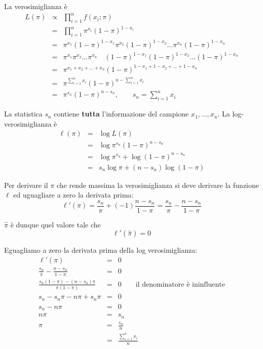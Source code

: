 \documentclass[
  11pt,
]{book}
\theoremstyle{mytheoremstyle}
\theoremstyle{mydefstyle}
\begin{document}
La verosimiglianza è
\begin{eqnarray*}
L(\pi)     &\propto& \prod_{i=1}^n f(x_i;\pi)\\
           &=& \prod_{i=1}^n \pi^{x_i}(1-\pi)^{1-x_i}\\
           &=& \pi^{x_1}(1-\pi)^{1-x_1} \pi^{x_2}(1-\pi)^{1-x_2} ... \pi^{x_n}(1-\pi)^{1-x_n}\\
           &=& \pi^{x_1}\pi^{x_2}...\pi^{x_n}\quad (1-\pi)^{1-x_1}(1-\pi)^{1-x_2}...(1-\pi)^{1-x_n}\\
           &=& \pi^{x_1+x_2+...+x_n}(1-\pi)^{1-x_1+1-x_2+...+1-x_n}\\
           &=& \pi^{\sum_{i=1}^n x_i}(1-\pi)^{n-\sum_{i=1}^n x_i}\\
           &=& \pi^{s_n}(1-\pi)^{n-s_n}, \qquad s_n=\sum_{i=1}^n x_i
\end{eqnarray*}

La statistica \(s_n\) contiene \textbf{tutta} l'informazione del campione \(x_1,...,x_n\).
La log-verosimiglianza è
\begin{eqnarray*}
\ell(\pi)  &=& \log L(\pi)\\
           &=& \log \pi^{s_n}(1-\pi)^{n-s_n}\\
           &=& \log \pi^{s_n} + \log (1-\pi)^{n-s_n}\\
           &=& s_n \log \pi + (n-s_n) \log (1-\pi)
\end{eqnarray*}

Per derivare il \(\pi\) che rende massima la verosimiglianza si deve derivare la funzione \(\ell\) ed uguagliare a zero la derivata prima:
\[\ell'(\pi)= \frac{s_n}{\pi}+(-1)\frac{n-s_n}{1-\pi}=\frac{s_n}{\pi}-\frac{n-s_n}{1-\pi}\]

\(\hat\pi\) è dunque quel valore tale che
\[\ell'(\hat\pi)=0\]

Eguagliamo a zero la derivata prima della log verosimiglianza:
\begin{eqnarray*}
\ell'(\pi)  &=& 0 \\
\frac{s_n}{\pi}-\frac{n-s_n}{1-\pi}          &=& 0 \\
\frac{s_n(1-\pi)-(n-s_n)\pi}{\pi(1-\pi)}     &=& 0\qquad \text{il denominatore è ininfluente} \\
s_n - s_n \pi - n \pi + s_n \pi              &=& 0 \\
s_n- n \pi                                   &=& 0\\
n\pi                                         &=& s_n \\
\hat\pi                                      &=& \frac{s_n}n\\
                                             &=& \frac{\sum_{i=1}^n x_i}n
\end{eqnarray*}
\end{document}
